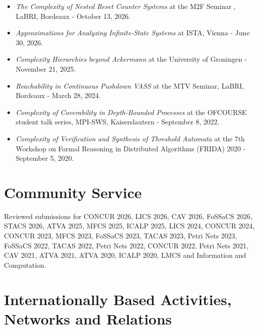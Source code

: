 \documentclass[11pt,a4paper,sans]{moderncv}        %
\begin{document}
\begin{itemize}
	\setlength\itemsep{2pt} 
	\item \textit{The Complexity of Nested Reset Counter Systems} at the M2F Seminar , LaBRI, Bordeaux - October 13, 2026.
	\item \textit{Approximations for Analyzing Infinite-State Systems} at ISTA, Vienna - June 30, 2026.
	\item \textit{Complexity Hierarchies beyond Ackermann} at the University of Groningen - November 21, 2025. 
	\item \textit{Reachability in Continuous Pushdown VASS} at the MTV Seminar, LaBRI, Bordeaux - March 28, 2024.
	\item \textit{Complexity of Coverability in Depth-Bounded Processes} at 
	the OFCOURSE student talk series, MPI-SWS, Kaiserslautern - September 8, 2022.
	\item \textit{Complexity of Verification and Synthesis of Threshold Automata} at 
	the 7th Workshop on Formal Reasoning in Distributed Algorithms (FRIDA) 2020 - September 5, 2020. 
\end{itemize}




\section{Community Service}

Reviewed submissions for CONCUR 2026, LICS 2026, CAV 2026, FoSSaCS 2026, STACS 2026, ATVA 2025, MFCS 2025, ICALP 2025, LICS 2024, CONCUR 2024, CONCUR 2023, MFCS 2023, FoSSaCS 2023, TACAS 2023, Petri Nets 2023, FoSSaCS 2022, TACAS 2022, Petri Nets 2022, CONCUR 2022, Petri Nets 2021, CAV 2021, ATVA 2021, ATVA 2020, ICALP 2020, LMCS and Information and Computation. 


\section{Internationally Based Activities, Networks and Relations}


\vspace{5pt}
\end{document}
